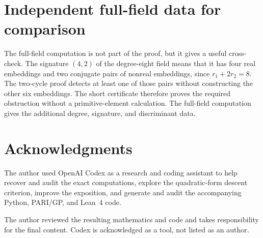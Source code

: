 \documentclass[11pt]{article}
\numberwithin{equation}{section}
\theoremstyle{definition}
\theoremstyle{remark}
\begin{document}
\section{Independent full-field data for comparison}
\label{app:full-field}

The full-field computation is not part of the proof, but it gives a useful
cross-check.  The signature \((4,2)\) of the degree-eight field means that it
has four real embeddings and two conjugate pairs of nonreal embeddings,
since \(r_1+2r_2=8\).  The two-cycle proof detects at least one of those pairs
without constructing the other six embeddings.  The short certificate
therefore proves the required obstruction without a
primitive-element calculation.  The full-field computation gives the
additional degree, signature, and discriminant data.

\section*{Acknowledgments}

The author used OpenAI Codex as a research and coding assistant to help
recover and audit the exact computations, explore the quadratic-form descent
criterion, improve the exposition, and generate and audit the accompanying
Python, PARI/GP, and Lean~4 code.

The author reviewed the resulting mathematics and code and takes
responsibility for the final content.  Codex is acknowledged as a tool, not
listed as an author.


\begingroup
\raggedright

\endgroup
\end{document}
